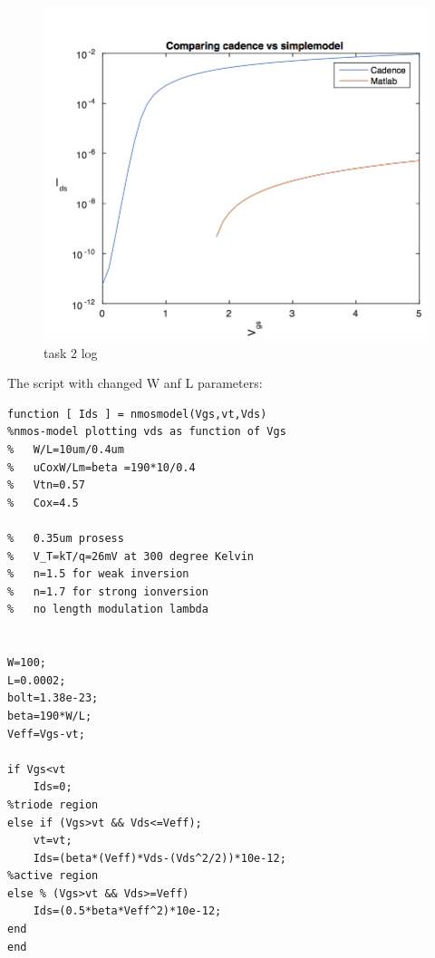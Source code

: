 \documentclass[11pt,a4paper,final]{report}
\begin{document}
\begin{figure}[h!btp]
\caption{task 2 log}
\includegraphics[scale=1]{2task2log.png}
\end{figure}

The script with changed W anf L parameters:
\begin{verbatim}
function [ Ids ] = nmosmodel(Vgs,vt,Vds)
%nmos-model plotting vds as function of Vgs
%   W/L=10um/0.4um
%   uCoxW/Lm=beta =190*10/0.4
%   Vtn=0.57
%   Cox=4.5

%   0.35um prosess
%   V_T=kT/q=26mV at 300 degree Kelvin
%   n=1.5 for weak inversion
%   n=1.7 for strong ionversion
%   no length modulation lambda


W=100;
L=0.0002;
bolt=1.38e-23;
beta=190*W/L;
Veff=Vgs-vt;

if Vgs<vt
    Ids=0;
%triode region
else if (Vgs>vt && Vds<=Veff);
    vt=vt;
    Ids=(beta*(Veff)*Vds-(Vds^2/2))*10e-12;
%active region
else % (Vgs>vt && Vds>=Veff)
    Ids=(0.5*beta*Veff^2)*10e-12;
end
end
\end{verbatim}
\end{document}
